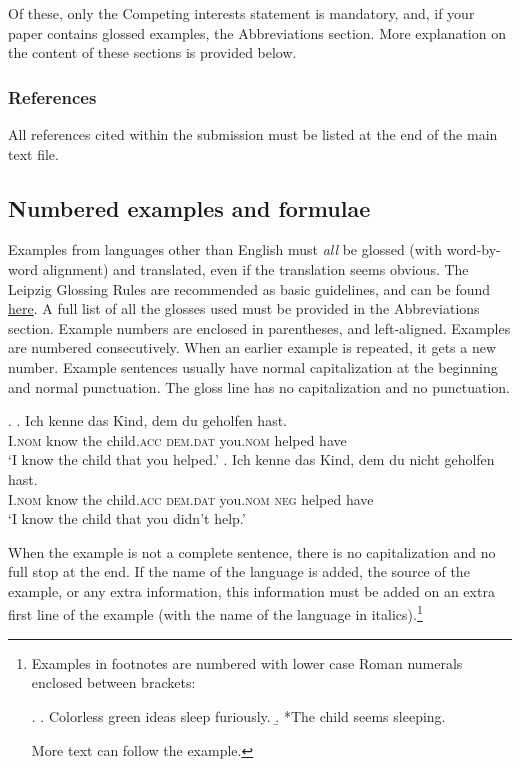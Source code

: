 \documentclass[]{glossa}
\begin{document}
Of these, only the Competing interests statement is mandatory, and, if
your paper contains glossed examples, the Abbreviations section. More
explanation on the content of these sections is provided below.

\hypertarget{references}{%
\subsubsection{References}\label{references}}

All references cited within the submission must be listed at the end of
the main text file.

\hypertarget{numbered-examples-and-formulae}{%
\subsection{Numbered examples and
formulae}\label{numbered-examples-and-formulae}}

Examples from languages other than English must \emph{all} be glossed
(with word-by-word alignment) and translated, even if the translation
seems obvious. The Leipzig Glossing Rules are recommended as basic
guidelines, and can be found
\href{http://www.eva.mpg.de/lingua/resources/glossing-rules.php}{here}.
A full list of all the glosses used must be provided in the
Abbreviations section. Example numbers are enclosed in parentheses, and
left-aligned. Examples are numbered consecutively. When an earlier
example is repeated, it gets a new number. Example sentences usually
have normal capitalization at the beginning and normal punctuation. The
gloss line has no capitalization and no punctuation.

\ex. \ag. Ich   kenne das Kind, dem du geholfen hast.\\
I.\textsc{nom} know the child.\textsc{acc} \textsc{dem.dat} you.\textsc{nom} helped have\\
\glt `I know the child that you helped.'
\bg. Ich kenne das Kind, dem du nicht geholfen hast. \\
I.\textsc{nom} know  the child.\textsc{acc} \textsc{dem.dat} you.\textsc{nom} \textsc{neg} helped   have\\
\glt `I know the child that you didn’t help.’

When the example is not a complete sentence, there is no capitalization
and no full stop at the end. If the name of the language is added, the
source of the example, or any extra information, this information must
be added on an extra first line of the example (with the name of the
language in
italics).\footnote{Examples in footnotes are numbered with lower case Roman numerals enclosed between brackets:

\ex.
\a. Colorless green ideas sleep furiously.
\b. *The child seems sleeping.

More text can follow the example.}
\end{document}

